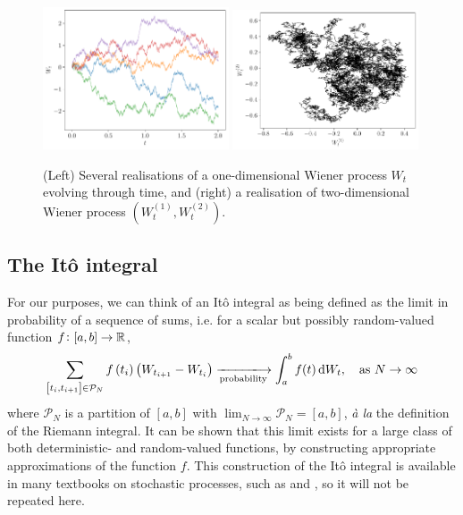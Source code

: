 \begin{figure}
	\begin{center}
		\includegraphics[width=0.49\textwidth]{figures/wiener_realisations_1d.pdf}
		\includegraphics[width=0.49\textwidth]{figures/wiener_realisations_2d.pdf}
		\caption{(Left) Several realisations of a one-dimensional Wiener process \(W_t\) evolving through time, and (right) a realisation of two-dimensional Wiener process \(\left(W_t^{(1)}, W_t^{(2)}\right)\).}
		\label{fig:wiener_rels}
	\end{center}
\end{figure}



\subsection{The It\^o integral}
For our purposes, we can think of an It\^o integral as being defined as the limit in probability of a sequence of sums, i.e. for a scalar but possibly random-valued function \(f\colon [a,b] \to \mathbb{R}\),
\begin{equation}\label{eqn:ito_int_limit_defn}
	\sum_{\left[t_i, t_{i+1}\right] \in \mathcal{P}_N}{f\left(t_{i}\right)\left(W_{t_{i+1}} - W_{t_i}\right)} \xlongrightarrow[\text{probability}]{} \int_a^b{f(t)\dif W_t}, \quad \text{as } N \to \infty
\end{equation}
where \(\mathcal{P}_N\) is a partition of \(\left[a,b\right]\) with \(\lim_{N \to \infty}\mathcal{P}_N = [a,b]\), \emph{\`a la} the definition of the Riemann integral.
It can be shown that this limit exists for a large class of both deterministic- and random-valued functions, by constructing appropriate approximations of the function \(f\).
This construction of the It\^o integral is available in many textbooks on stochastic processes, such as \citet{KallianpurSundar_2014_StochasticAnalysisDiffusion} and \citet{Oksendal_2003_StochasticDifferentialEquations}, so it will not be repeated here.

